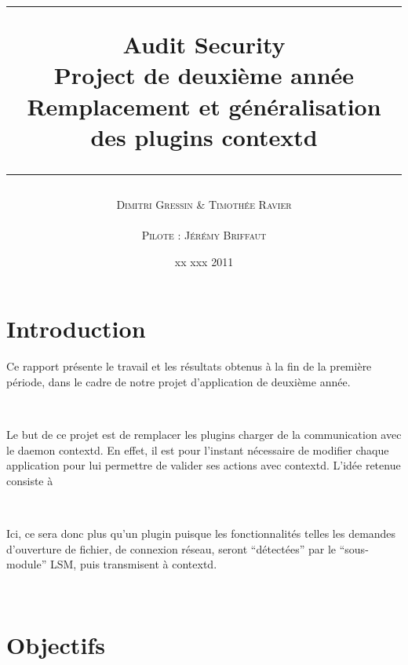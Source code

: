 \documentclass[pdftex,a4paper,titlepage,11pt,openright]{article}
\newcommand{\nom}[1]{\textsc{#1}}
\newcommand{\ligne}[1][1pt]{
  \par\noindent
  \rule[.5ex]{\linewidth}{#1}\par}
\newcommand{\clearemptydoublepage}{
	\newpage{\pagestyle{empty}\cleardoublepage}}
\begin{document}
\setlength{\parskip}{2.4ex}

\title{
\ligne{\Large}
\textbf{Audit Security}\\
\textbf{Project de deuxième année}\\
\Large Remplacement et généralisation des plugins contextd
\ligne{\Large}
}
\author{\nom{Dimitri Gressin} \& \nom{Timothée Ravier}\\\\\nom{Pilote : Jérémy Briffaut}}
\date{xx xxx 2011} %

\maketitle

\clearemptydoublepage

\setcounter{secnumdepth}{2}
\setcounter{tocdepth}{2}
\tableofcontents
\addtocounter{page}{-1}

\newpage

\section*{Introduction} 
Ce rapport présente le travail et les résultats obtenus à la fin de la première période, dans le cadre de notre projet d'application de deuxième année.

~

Le but de ce projet est de remplacer les plugins charger de la communication avec le daemon contextd. En effet, il est pour l'instant nécessaire de modifier chaque application pour lui permettre de valider ses actions avec contextd. L'idée retenue consiste à

~

Ici, ce sera donc plus qu'un plugin puisque les fonctionnalités telles les demandes d'ouverture de fichier, de connexion réseau, seront ``détectées'' par le ``sous-module'' LSM, puis transmisent à contextd.

~


\newpage

\section{Objectifs}
\end{document}
